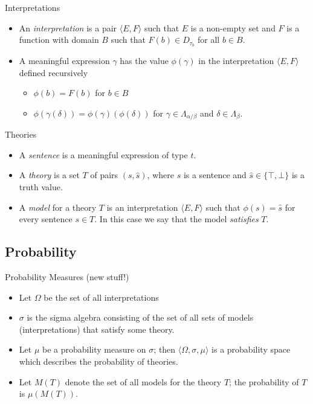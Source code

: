 \documentclass{beamer}
\newlength{\wideitemsep}
\let\olditem\item
\renewcommand{\item}{\setlength{\itemsep}{\wideitemsep}\olditem}
\begin{document}
\begin{frame}{Interpretations}
  \begin{itemize}
  \item An \emph{interpretation} is a pair $\langle E,
    F\rangle$ such that $E$ is a non-empty set and $F$ is a function with
    domain $B$ such that $F(b) \in D_{\tau_b}$ for all $b\in B$.
  \item A meaningful expression $\gamma$ has the value $\phi(\gamma)$ in the
    interpretation $\langle E, F\rangle$ defined recursively
    \begin{itemize}
    \item $\phi(b) = F(b)$ for $b\in B$
    \item $\phi(\gamma(\delta)) = \phi(\gamma)(\phi(\delta))$ for $\gamma
      \in \Lambda_{\alpha/\beta}$ and $\delta \in \Lambda_\beta$.
    \end{itemize}
  \end{itemize}
\end{frame}

\begin{frame}{Theories}
  \begin{itemize}
  \item A \emph{sentence} is a meaningful expression of type $t$.
  \item A \emph{theory} is a set $T$ of pairs $(s,\hat{s})$, where $s$
    is a sentence and $\hat{s}\in\{\top,\bot\}$ is a truth value.
  \item A \emph{model} for a theory $T$ is an interpretation $\langle
    E, F\rangle$ such that $\phi(s) = \hat{s}$ for every sentence
    $s\in T$. In this case we say that the model \emph{satisfies} $T$.
  \end{itemize}
\end{frame}

\subsection{Probability}

\begin{frame}{Probability Measures (new stuff!)}
  \begin{itemize}
  \item Let $\Omega$ be the set of all interpretations
  \item $\sigma$ is the sigma algebra consisting of the set of all
    sets of models (interpretations) that satisfy some theory.
  \item Let $\mu$ be a probability measure on $\sigma$; then
    $\langle\Omega,\sigma,\mu\rangle$ is a probability space which
    describes the probability of theories.
  \item Let $M(T)$ denote the set of all models for the theory $T$;
    the probability of $T$ is $\mu(M(T))$.
  \end{itemize}
\end{frame}
\end{document}
